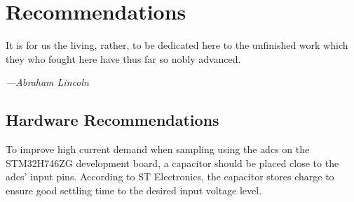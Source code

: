 \documentclass[class=report,11pt,crop=false]{standalone}
\begin{document}
\chapter{Recommendations \label{ch:recommendations}}
\epigraph{It is for us the living, rather, to be dedicated here to the unfinished work which they who fought here have thus far so nobly advanced.}%
    {\emph{---Abraham Lincoln}}
\vspace{0.5cm}
\section{Hardware Recommendations}

To improve high current demand when sampling using the \acrshort{adc}s on the STM32H746ZG development board, a capacitor should be placed close to the \acrshort{adc}s' input pins. According to ST Electronics, the capacitor stores charge to ensure good settling time to the desired input voltage level.   
\ifstandalone

\printnoidxglossary[type=\acronymtype,nonumberlist]
\fi
\end{document}
